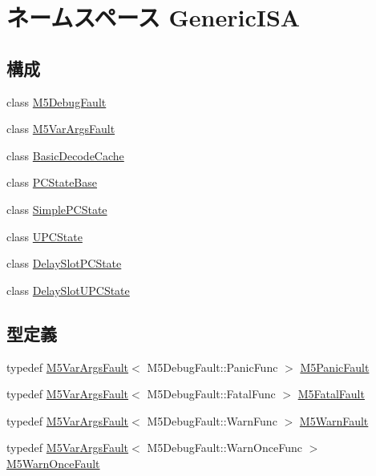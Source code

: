 \hypertarget{namespaceGenericISA}{
\section{ネームスペース GenericISA}
\label{namespaceGenericISA}
}
\subsection*{構成}
\begin{DoxyCompactItemize}
\item 
class \hyperlink{classGenericISA_1_1M5DebugFault}{M5DebugFault}
\item 
class \hyperlink{classGenericISA_1_1M5VarArgsFault}{M5VarArgsFault}
\item 
class \hyperlink{classGenericISA_1_1BasicDecodeCache}{BasicDecodeCache}
\item 
class \hyperlink{classGenericISA_1_1PCStateBase}{PCStateBase}
\item 
class \hyperlink{classGenericISA_1_1SimplePCState}{SimplePCState}
\item 
class \hyperlink{classGenericISA_1_1UPCState}{UPCState}
\item 
class \hyperlink{classGenericISA_1_1DelaySlotPCState}{DelaySlotPCState}
\item 
class \hyperlink{classGenericISA_1_1DelaySlotUPCState}{DelaySlotUPCState}
\end{DoxyCompactItemize}
\subsection*{型定義}
\begin{DoxyCompactItemize}
\item 
typedef \hyperlink{classGenericISA_1_1M5VarArgsFault}{M5VarArgsFault}$<$ M5DebugFault::PanicFunc $>$ \hyperlink{namespaceGenericISA_a3427cc78f489a7ee730b871fcb4c1960}{M5PanicFault}
\item 
typedef \hyperlink{classGenericISA_1_1M5VarArgsFault}{M5VarArgsFault}$<$ M5DebugFault::FatalFunc $>$ \hyperlink{namespaceGenericISA_a7eadd3e78154f25c430d19d74ac7eb0c}{M5FatalFault}
\item 
typedef \hyperlink{classGenericISA_1_1M5VarArgsFault}{M5VarArgsFault}$<$ M5DebugFault::WarnFunc $>$ \hyperlink{namespaceGenericISA_ad2999c164328ac8e86d95c538d694132}{M5WarnFault}
\item 
typedef \hyperlink{classGenericISA_1_1M5VarArgsFault}{M5VarArgsFault}$<$ M5DebugFault::WarnOnceFunc $>$ \hyperlink{namespaceGenericISA_ae33236ed5f8a96d7a8c02ad15024384a}{M5WarnOnceFault}
\end{DoxyCompactItemize}
